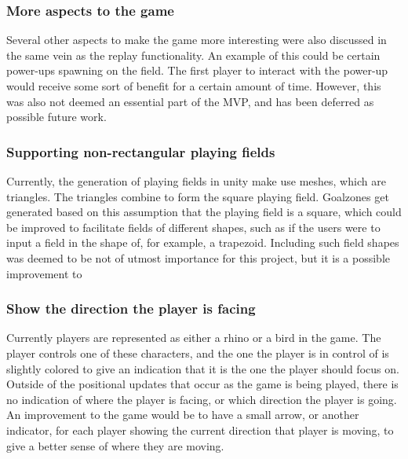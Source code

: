 \subsubsection{More aspects to the game}
Several other aspects to make the game more interesting were also discussed in the same vein as the replay functionality.
An example of this could be certain power-ups spawning on the field.
The first player to interact with the power-up would receive some sort of benefit for a certain amount of time.
However, this was also not deemed an essential part of the MVP, and has been deferred as possible future work.

\subsubsection{Supporting non-rectangular playing fields}
Currently, the generation of playing fields in unity make use meshes, which are triangles.
The triangles combine to form the square playing field.
Goalzones get generated based on this assumption that the playing field is a square, which could be improved to facilitate fields of different shapes, such as if the users were to input a field in the shape of, for example, a trapezoid.
Including such field shapes was deemed to be not of utmost importance for this project, but it is a possible improvement to 

\subsubsection{Show the direction the player is facing}
Currently players are represented as either a rhino or a bird in the game.
The player controls one of these characters, and the one the player is in control of is slightly colored to give an indication that it is the one the player should focus on.
Outside of the positional updates that occur as the game is being played, there is no indication of where the player is facing, or which direction the player is going.
An improvement to the game would be to have a small arrow, or another indicator, for each player showing the current direction that player is moving, to give a better sense of where they are moving.
